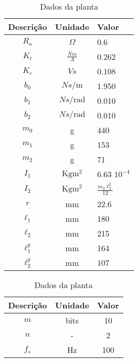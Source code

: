     \begin{table}[!ht]
        \begin{minipage}[b]{0.45\linewidth}\centering
                \begin{tabular}{|c|c|l|}
                    \hline Descrição & Unidade & Valor\\ \hline
                    $R_a$ & $\Omega$ & 0.6\\
                    $K_t$ & $\frac{Nm}{A}$ & 0.262\\
                    $K_e$ & $Vs$ & 0.108\\
                    $b_0$   & ${N s}/{\mathrm{m}}$ & 1.950\\
                    $b_1$   & ${N s}/{\mathrm{rad}}$ & 0.010\\
                    $b_2$   & ${N s}/{\mathrm{rad}}$ & 0.010\\
                    $m_0$ & g & 440\\
                    $m_1$ & g & 153\\
                    $m_2$ & g & 71\\
                    $I_1$ & ${\mathrm{Kg} \mathrm{m^2}}$ & 6.63 $10^{-4}$\\
                    $I_2$ & ${\mathrm{Kg} \mathrm{m^2}}$ & $\frac{m_2 \ell_2^2}{12}$\\
                    $r$ & mm & 22.6\\
                    $\ell_1$ & mm & 180\\ 
                    $\ell_2$ & mm  & 215\\
                    $\ell_1^g$ & mm & 164\\ 
                    $\ell_2^g$ & mm  & 107\\
                    \hline
                \end{tabular}
                \caption{Dados da planta}
                \label{tab:dados_planta}
        \end{minipage}
        \hspace{0.5cm}
        \begin{minipage}[b]{0.45\linewidth}
        \centering
                \begin{tabular}{|c|c|c|}
                    \hline Descrição & Unidade & Valor\\ \hline
                    $m$ & bits & 10 \\
                    $n$ & - & 2 \\
                    $f_s$ & Hz & 100 \\

\end{tabular}
\end{minipage}
\end{table}
